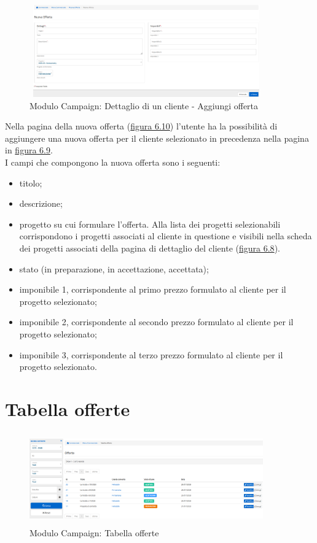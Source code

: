 \begin{figure}[!h]
\centering
\includegraphics[width=380px, height=150px]{../images/UI/10-nuovaOfferta.png}
\caption{Modulo Campaign: Dettaglio di un cliente - Aggiungi offerta}
\label{fig:nuovaOfferta}
\end{figure}

\noindent Nella pagina della nuova offerta ({\hyperref[fig:nuovaOfferta]{figura 6.10}}) l'utente ha la possibilità di aggiungere una nuova offerta per il cliente selezionato in precedenza nella pagina in {\hyperref[fig:dettaglioCliente2]{figura 6.9}}. \\
I campi che compongono la nuova offerta sono i seguenti:
\begin{itemize}
\item titolo;
\item descrizione;
\item progetto su cui formulare l'offerta. Alla lista dei progetti selezionabili corrispondono i progetti associati al cliente in questione e visibili nella scheda dei progetti associati della pagina di dettaglio del cliente ({\hyperref[fig:dettaglioCliente1]{figura 6.8}}). 
\item stato (in preparazione, in accettazione, accettata);
\item imponibile 1, corrispondente al primo prezzo formulato al cliente per il progetto selezionato;
\item imponibile 2, corrispondente al secondo prezzo formulato al cliente per il progetto selezionato;
\item imponibile 3, corrispondente al terzo prezzo formulato al cliente per il progetto selezionato.
\end{itemize}

\section{Tabella offerte}
\begin{figure}[!h]
\centering
\includegraphics[width=380px, height=150px]{../images/UI/11-tabellaOfferte.png}
\caption{Modulo Campaign: Tabella offerte}
\label{fig:tabellaOfferte}
\end{figure}

